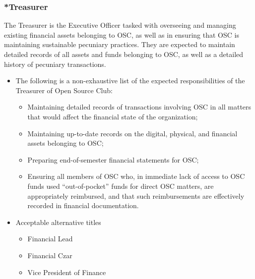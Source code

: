 \documentclass[12pt,letterpaper]{article}
\begin{document}
\subsubsection{*Treasurer}
The Treasurer is the Executive Officer tasked with overseeing
and managing existing financial assets belonging to OSC, as well as in ensuring
that OSC is maintaining sustainable pecuniary practices. They are expected to maintain
detailed records of all assets and funds belonging to OSC, as well as a detailed history
of pecuniary transactions.
\begin{itemize}
  \item The following is a non-exhaustive list of the expected responsibilities of the
    Treasurer of Open Source Club:
    \begin{itemize}
      \item Maintaining detailed records of transactions involving OSC in all matters
        that would affect the financial state of the organization;
      \item Maintaining up-to-date records on the digital, physical, and financial assets
        belonging to OSC;
      \item Preparing end-of-semester financial statements for OSC;
      \item Ensuring all members of OSC who, in immediate lack of access to OSC funds
        used ``out-of-pocket'' funds for direct OSC matters, are appropriately reimbursed,
        and that such reimbursements are effectively recorded in financial documentation.
    \end{itemize}
  \item Acceptable alternative titles
    \begin{itemize}
      \item Financial Lead
      \item Financial Czar
      \item Vice President of Finance
    \end{itemize}
\end{itemize}
\end{document}
